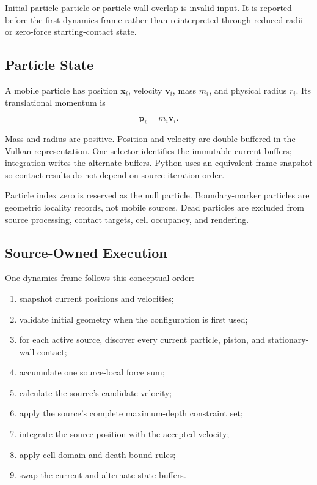 Initial particle-particle or particle-wall overlap is invalid input.  It is
reported before the first dynamics frame rather than reinterpreted through
reduced radii or zero-force starting-contact state.

\subsection{Particle State}

A mobile particle has position \(\mathbf x_i\), velocity \(\mathbf v_i\),
mass \(m_i\), and physical radius \(r_i\).  Its translational momentum is

\begin{equation}
\mathbf p_i=m_i\mathbf v_i.
\end{equation}

Mass and radius are positive.  Position and velocity are double buffered in
the Vulkan representation.  One selector identifies the immutable current
buffers; integration writes the alternate buffers.  Python uses an equivalent
frame snapshot so contact results do not depend on source iteration order.

Particle index zero is reserved as the null particle.  Boundary-marker
particles are geometric locality records, not mobile sources.  Dead particles
are excluded from source processing, contact targets, cell occupancy, and
rendering.

\subsection{Source-Owned Execution}

One dynamics frame follows this conceptual order:

\begin{enumerate}
    \item snapshot current positions and velocities;
    \item validate initial geometry when the configuration is first used;
    \item for each active source, discover every current particle, piston, and
          stationary-wall contact;
    \item accumulate one source-local force sum;
    \item calculate the source's candidate velocity;
    \item apply the source's complete maximum-depth constraint set;
    \item integrate the source position with the accepted velocity;
    \item apply cell-domain and death-bound rules;
    \item swap the current and alternate state buffers.
\end{enumerate}

